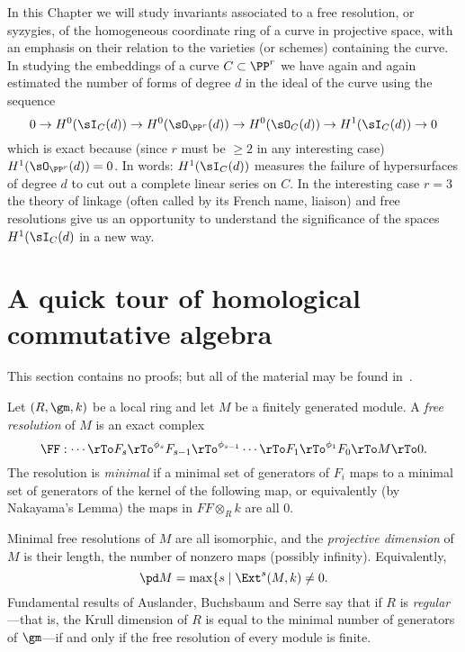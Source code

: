 In this Chapter we will study  invariants associated to a free resolution, or syzygies, of the homogeneous coordinate ring of a curve in projective space, with an emphasis on their relation to the varieties (or schemes) containing the curve. 
In studying the embeddings of a curve $C\subset \PP^r$  we have again and again estimated the number of
forms of degree $d$ in the ideal of the curve using the sequence
$$
0\to H^0(\sI_C(d)) \to H^0(\sO_{\PP^r}(d))\to  H^0(\sO_C(d)) \to H^1(\sI_C(d))\to 0
$$
which is exact because (since $r$ must be $\geq 2$ in any interesting case) $H^1(\sO_{\PP^r}(d))= 0$. In words: 
$H^1(\sI_C(d))$ measures the failure of hypersurfaces of degree $d$ to cut out a complete linear series on $C$.
In the interesting case $r=3$ the theory of linkage (often called by its French name, liaison) and free resolutions give us an opportunity
to understand the significance of the spaces $H^1(\sI_C(d)$ in a new way. 

\section{A quick tour of homological commutative algebra}
This section contains no proofs; but all of the material may be found in~\cite{Eisenbud1995}.

Let $(R,\gm, k)$ be a local ring and let $M$ be a finitely generated module. A \emph{free resolution} of $M$ is an exact complex
$$
\FF: \cdots \rTo F_s \rTo^{\phi_s} F_{s-1} \rTo^{\phi_{s-1}} \cdots \rTo F_1 \rTo^{\phi_1}  F_0 \rTo M \rTo 0.
$$
The resolution is \emph{minimal} if a minimal set of generators of $F_i$ maps to a minimal set of generators of the kernel of the following map,
or equivalently (by Nakayama's Lemma) the maps in $FF\otimes_R k$ are all 0.

Minimal free resolutions of $M$ are all isomorphic, and the \emph{projective dimension}  of $M$ is their length, the number of nonzero
maps (possibly infinity). Equivalently, 
$$
\pd M = \max\{s \mid \Ext^s(M,k) \neq 0.
$$
Fundamental
results of Auslander, Buchsbaum and Serre say that if $R$ is \emph{regular}---that is, the Krull dimension of $R$ is equal to the minimal number
of generators of $\gm$---if and only if the free resolution of every module is finite.

